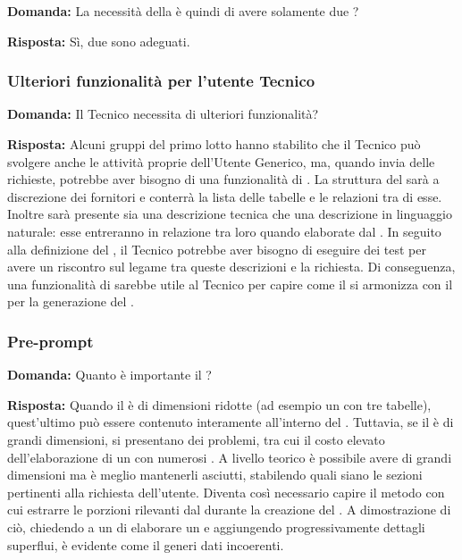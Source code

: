 \textbf{Domanda:} La necessità della  è quindi di avere solamente due ?

\textbf{Risposta:} Sì, due  sono adeguati.


\subsubsection{Ulteriori funzionalità per l'utente Tecnico}

\textbf{Domanda:} Il Tecnico necessita di ulteriori funzionalità?

\textbf{Risposta:} Alcuni gruppi del primo lotto hanno stabilito che il Tecnico può svolgere anche le attività proprie dell’Utente Generico, ma, quando invia delle richieste, potrebbe aver bisogno di una funzionalità di .
La struttura del  sarà a discrezione dei fornitori e conterrà la lista delle tabelle e le relazioni tra di esse. Inoltre sarà presente sia una descrizione tecnica che una descrizione in linguaggio naturale: esse entreranno in relazione tra loro quando elaborate dal . In seguito alla definizione del , il Tecnico potrebbe aver bisogno di eseguire dei test per avere un riscontro sul legame tra queste descrizioni e la richiesta. Di conseguenza, una funzionalità di  sarebbe utile al Tecnico per capire come il  si armonizza con il  per la generazione del .


\subsubsection{Pre-prompt}

\textbf{Domanda:} Quanto è importante il ?

\textbf{Risposta:} Quando il  è di dimensioni ridotte (ad esempio un  con tre tabelle), quest'ultimo può essere contenuto interamente all’interno del . Tuttavia, se il  è di grandi dimensioni, si presentano dei problemi, tra cui il costo elevato dell’elaborazione di un  con numerosi . A livello teorico è possibile avere  di grandi dimensioni ma è meglio mantenerli asciutti, stabilendo quali siano le sezioni pertinenti alla richiesta dell’utente. Diventa così necessario capire il metodo con cui estrarre le porzioni rilevanti dal  durante la creazione del .
 A dimostrazione di ciò, chiedendo a un  di elaborare un  e aggiungendo progressivamente dettagli superflui, è evidente come il  generi dati incoerenti.

